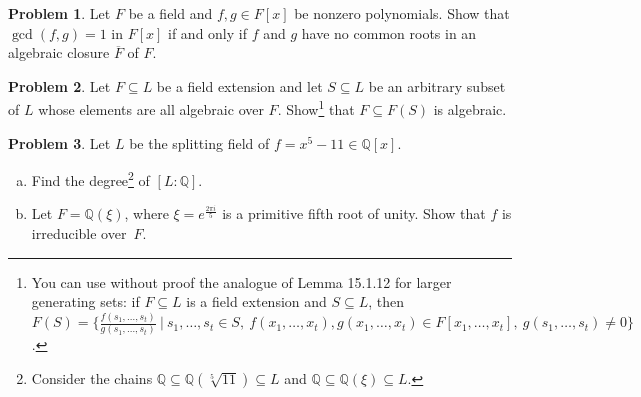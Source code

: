 \documentclass[11pt]{article}
\newcommand{\Q}{\mathbb{Q}}
\theoremstyle{definition}
\newtheorem{problem}{Problem}
\begin{document}
\begin{problem}
Let $F$ be a field and $f,g \in F[x]$ be nonzero polynomials. Show that $\gcd(f,g) = 1$ in $F[x]$ if and only if $f$ and $g$ have no common roots in an algebraic closure $\overline{F}$ of $F$.
\end{problem}



\begin{problem}
	Let $F \subseteq L$ be a field extension and let $S \subseteq L$ be an arbitrary subset of $L$ whose elements are all algebraic over $F$. Show\footnote{You can use without proof the analogue of Lemma 15.1.12 for larger generating sets: if $F\subseteq L$ is a field extension and $S\subseteq L$, then $F(S) = \{ \frac{f(s_1,\dots,s_t)}{g(s_1,\dots,s_t)} \ | \ s_1,\dots,s_t\in S, \ f(x_1,\dots,x_t), g(x_1,\dots,x_t)\in F[x_1,\dots,x_t], \ g(s_1,\dots,s_t)\neq 0\}$.}
	 that $F \subseteq F(S)$ is algebraic.
\end{problem}


\begin{problem}
	Let $L$ be the splitting field of $f = x^5 - 11 \in \Q[x]$.
	\begin{enumerate}[(a)]
		\item Find the degree\footnote{Consider the chains $\Q \subseteq \Q(\sqrt[5]{11}) \subseteq L$ and $\Q \subseteq \Q(\xi) \subseteq L$.} of $[L : \Q]$.
		\item Let $F = \Q(\xi)$, where $\xi = e^{\frac{2 \pi i}{5}}$ is a primitive fifth root of unity. Show that $f$ is irreducible over~$F$.
	\end{enumerate}
\end{problem}
\end{document}

